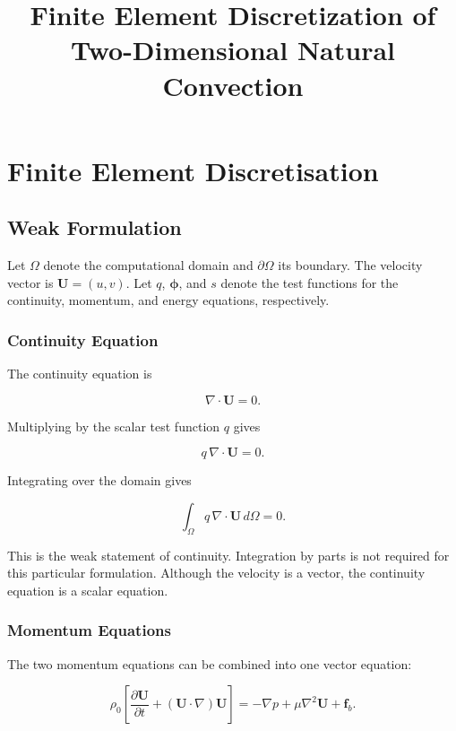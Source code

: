 \documentclass{article}
\title{Finite Element Discretization of Two-Dimensional Natural Convection}
\author{}
\date{}
\begin{document}
\maketitle

\section{Finite Element Discretisation}

\subsection{Weak Formulation}

Let $\Omega$ denote the computational domain and
$\partial\Omega$ its boundary. The velocity vector is
$\mathbf{U}=(u,v)$. Let $q$, $\boldsymbol{\phi}$,
and $s$ denote the test functions for the continuity,
momentum, and energy equations, respectively.

\subsubsection{Continuity Equation}

The continuity equation is

\begin{equation}
\nabla\cdot\mathbf{U}=0.
\end{equation}

Multiplying by the scalar test function $q$ gives

\[
q\,\nabla\cdot\mathbf{U}=0.
\]

Integrating over the domain gives

\begin{equation}
\boxed{
\int_{\Omega}q\,\nabla\cdot\mathbf{U}\,d\Omega=0.
}
\end{equation}

This is the weak statement of continuity. Integration by
parts is not required for this particular formulation.
Although the velocity is a vector, the continuity equation
is a scalar equation.

\subsubsection{Momentum Equations}

The two momentum equations can be combined into one
vector equation:

\begin{equation}
\rho_0\left[
\frac{\partial\mathbf{U}}{\partial t}
+(\mathbf{U}\cdot\nabla)\mathbf{U}
\right]
=-\nabla p+\mu\nabla^2\mathbf{U}+\mathbf{f}_b.
\end{equation}
\end{document}
